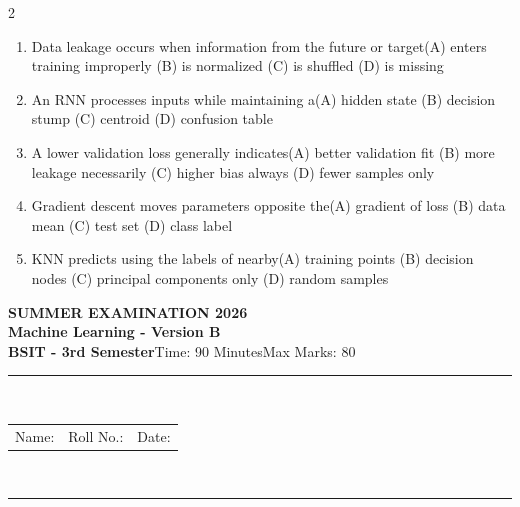 \documentclass[a4paper]{article}
\makeatletter
\newcommand{\examheader}{%
\begin{center}\textbf{\large SUMMER EXAMINATION 2026}\\[-1pt]
\textbf{\normalsize Machine Learning - Version B}\\[-1pt]
\textbf{BSIT - 3rd Semester}\quad Time: 90 Minutes\quad Max Marks: 80\\[-1pt]
\textcolor{black!65}{\rule{\linewidth}{0.45pt}}\\[-2pt]
\begin{tabularx}{\linewidth}{@{}X X X@{}}Name: \hrulefill & Roll No.: \hrulefill & Date: \hrulefill\end{tabularx}\\[-1pt]
\textcolor{black!65}{\rule{\linewidth}{0.45pt}}\end{center}}
\makeatother
\begin{document}
\begin{multicols*}{2}
\begin{enumerate}
\item Data leakage occurs when information from the future or target\newline\hspace*{0.6em}(A) enters training improperly \quad (B) is normalized \newline\hspace*{0.6em}(C) is shuffled \quad (D) is missing
\item An RNN processes inputs while maintaining a\newline\hspace*{0.6em}(A) hidden state \quad (B) decision stump \newline\hspace*{0.6em}(C) centroid \quad (D) confusion table
\item A lower validation loss generally indicates\newline\hspace*{0.6em}(A) better validation fit \quad (B) more leakage necessarily \newline\hspace*{0.6em}(C) higher bias always \quad (D) fewer samples only
\item Gradient descent moves parameters opposite the\newline\hspace*{0.6em}(A) gradient of loss \quad (B) data mean \newline\hspace*{0.6em}(C) test set \quad (D) class label
\item KNN predicts using the labels of nearby\newline\hspace*{0.6em}(A) training points \quad (B) decision nodes \newline\hspace*{0.6em}(C) principal components only \quad (D) random samples
\end{enumerate}
\end{multicols*}
\newpage
\examheader
\raggedcolumns
\end{document}
